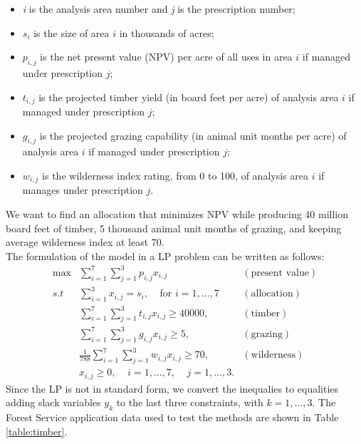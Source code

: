 \documentclass[a4paper,10 pt,titlepage,twoside]{book}
\theoremstyle{plain}
\theoremstyle{definition}
\theoremstyle{remark}
\begin{document}
\begin{itemize}
	\item \textit{i} is the analysis area number and \textit{j} is the prescription number;
	\item $s_{i}$ is the size of area $i$ in thousands of acres;
	\item $p_{i,j}$ is the net present value (NPV) per acre of all uses in area $i$ if managed under prescription $j$;
	\item $t_{i,j}$ is the projected timber yield (in board feet per acre) of analysis area $i$ if managed under prescription $j$;
	\item $g_{i,j}$ is the projected grazing capability (in animal unit months per acre) of analysis area $i$ if managed under prescription $j$;
	\item $w_{i,j}$ is the wilderness index rating, from 0 to 100, of analysis area $i$ if manages under prescription $j$.
\end{itemize}
We want to find an allocation that minimizes NPV while producing 40 million board feet of timber, 5 thousand animal unit months of grazing, and keeping average wilderness index at least 70.\\
The formulation of the model in a LP problem can be written as follows:
\begin{align*}
\max&\sum_{i=1}^{7}\sum_{j=1}^{3} p_{i,j}x_{i,j}&(\text{present value})\\
s.t\;\; & \sum_{i=1}^{3}x_{i,j}=s_{i},\;\;\;\;\text{for }i = 1, \dots,7&(\text{allocation})\\
&\sum_{i=1}^{7}\sum_{j=1}^{3} t_{i,j}x_{i,j}\geq 40000,&(\text{timber})\\
&\sum_{i=1}^{7}\sum_{j=1}^{3} g_{i,j}x_{i,j}\geq5,&(\text{grazing})\\
&\frac{1}{788}\sum_{i=1}^{7}\sum_{j=1}^{3} w_{i,j}x_{i,j}\geq 70,&(\text{wilderness})\\
&x_{i,j}\geq 0, \;\;\;\;i = 1,\dots,7,\;\;\;\;j = 1,\dots,3.
\end{align*}
Since the LP is not in standard form, we convert the inequalies to equalities adding slack variables $y_{k}$ to the last three constraints, with $k = 1, \dots, 3$. The Forest Service application data used to test the methods are shown in Table \ref{table:timber}.
\end{document}
